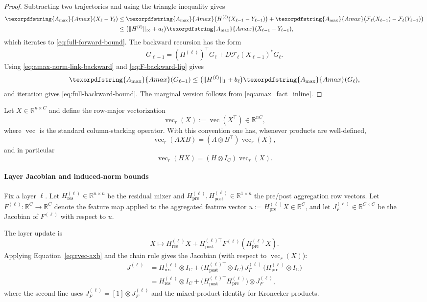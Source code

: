 \documentclass[10pt]{article}
\numberwithin{equation}{section}
\theoremstyle{plain}
\theoremstyle{definition}
\theoremstyle{remark}
\newcommand{\R}{\mathbb{R}}
\newcommand{\Hres}{H_{\mathrm{res}}}
\newcommand{\Hpre}{H_{\mathrm{pre}}}
\newcommand{\Hpost}{H_{\mathrm{post}}}
\newcommand{\vecop}{\operatorname{vec}}
\newcommand{\Amax}{\texorpdfstring{\ensuremath{A_{\max}}}{Amax}\xspace}
\begin{document}
\begin{proof}
Subtracting two trajectories and using the triangle inequality gives
\[
\begin{aligned}
\Amax(X_\ell-Y_\ell)
&\le \Amax\bigl(H^{(\ell)}(X_{\ell-1}-Y_{\ell-1})\bigr)
 +\Amax\bigl(\mathcal F_\ell(X_{\ell-1})-\mathcal F_\ell(Y_{\ell-1})\bigr)\\
&\le \bigl(\|H^{(\ell)}\|_\infty+a_\ell\bigr)\Amax(X_{\ell-1}-Y_{\ell-1}),
\end{aligned}
\]
which iterates to \eqref{eq:full-forward-bound}. The backward recursion has the form
\[
        G_{\ell-1}=(H^{(\ell)})^\top G_\ell+D\mathcal F_\ell(X_{\ell-1})^*G_\ell.
\]
Using \eqref{eq:amax-norm-link-backward} and \eqref{eq:F-backward-lip} gives
\[
        \Amax(G_{\ell-1})
        \le \bigl(\|H^{(\ell)}\|_1+b_\ell\bigr)\Amax(G_\ell),
\]
and iteration gives \eqref{eq:full-backward-bound}. The marginal version follows from \eqref{eq:amax_fact_inline}.
\end{proof}


Let $X\in\R^{n\times C}$ and define the row-major vectorization
\begin{equation}
\vecop_r(X):=\vecop(X^\top)\in\R^{nC},
\end{equation}
where $\vecop$ is the standard column-stacking operator.
With this convention one has, whenever products are well-defined,
\begin{equation}\label{eq:rvec-axb}
\vecop_r(AXB)=(A\otimes B^\top)\vecop_r(X),
\end{equation}
and in particular
\begin{equation}\label{eq:rvec-hx}
\vecop_r(HX)=(H\otimes I_C)\vecop_r(X).
\end{equation}


\paragraph{Layer Jacobian and induced-norm bounds}
Fix a layer $\ell$. Let $\Hres^{(\ell)}\in\R^{n\times n}$ be the residual mixer and
$\Hpre^{(\ell)},\Hpost^{(\ell)}\in\R^{1\times n}$ the pre/post aggregation row vectors.
Let $F^{(\ell)}:\R^{C}\to\R^{C}$ denote the feature map applied to the aggregated feature vector
$u:=\Hpre^{(\ell)}X\in\R^{C}$, and let $J_F^{(\ell)}\in\R^{C\times C}$ be the Jacobian of $F^{(\ell)}$ with respect to $u$.

The layer update is
\begin{equation}
X \mapsto \Hres^{(\ell)}X + \Hpost^{(\ell)\top}F^{(\ell)}(\Hpre^{(\ell)}X).
\end{equation}
Applying Equation~\eqref{eq:rvec-axb} and the chain rule gives the Jacobian (with respect to $\vecop_r(X)$):
\begin{align}\label{eq:jac}
J^{(\ell)}
&=
\Hres^{(\ell)}\otimes I_C
+
\big(\Hpost^{(\ell)\top}\otimes I_C\big)\,
J_F^{(\ell)}\,
\big(\Hpre^{(\ell)}\otimes I_C\big)\\
&=
\Hres^{(\ell)}\otimes I_C
+
\big(\Hpost^{(\ell)\top}\Hpre^{(\ell)}\big)\otimes J_F^{(\ell)},
\nonumber
\end{align}
where the second line uses $J_F^{(\ell)}=[1]\otimes J_F^{(\ell)}$ and the
mixed-product identity for Kronecker products.
\end{document}
